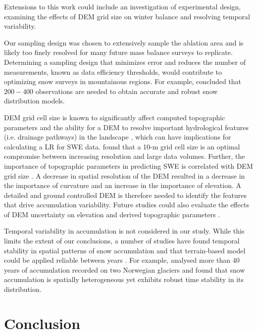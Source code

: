 \documentclass[twocolumn, letterpaper]{igs}
\begin{document}
Extensions to this work could include an investigation of experimental design, examining the effects of DEM grid size on winter balance and resolving temporal variability. 

Our sampling design was chosen to extensively sample the ablation area and is likely too finely resolved for many future mass balance surveys to replicate. Determining a sampling design that minimizes error and reduces the number of measurements, known as data efficiency thresholds, would contribute to optimizing snow surveys in mountainous regions. For example, \cite{Lopez2010} concluded that $200-400$ observations are needed to obtain accurate and robust snow distribution models. 

DEM grid cell size is known to significantly affect computed topographic parameters and the ability for a DEM to resolve important hydrological features (i.e. drainage pathways) in the landscape \citep{Zhang1994, Garbrecht1994, Guo-an2001, Lopez2010}, which can have implications for calculating a LR for SWE data.  \cite{Zhang1994} found that a 10-m grid cell size is an optimal compromise between increasing resolution and large data volumes. Further, the importance of topographic parameters in predicting SWE is correlated with DEM grid size \citep[e.g.][]{Kienzle2004, Lopez2010}. A decrease in spatial resolution of the DEM resulted in a decrease in the importance of curvature and an increase in the importance of elevation. A detailed and ground controlled DEM is therefore needed to identify the features that drive accumulation variability. Future studies could also evaluate the effects of DEM uncertainty on elevation and derived topographic parameters \citep [e.g.][]{Guo-an2001, Wechsler2006}.

Temporal variability in accumulation is not considered in our study. While this limits the extent of our conclusions, a number of studies have found temporal stability in spatial patterns of snow accumulation and that terrain-based model could be applied reliable between years \citep[e.g.][]{Grunewald2013}. For example, \cite{Walmsley2015} analysed more than 40 years of accumulation recorded on two Norwegian glaciers and found that snow accumulation is spatially heterogeneous yet exhibits robust time stability in its distribution. 

\section{Conclusion}
\end{document}
